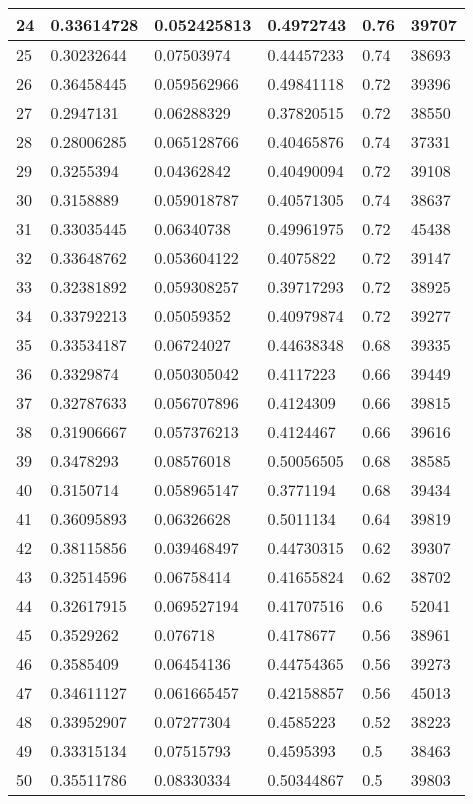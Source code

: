 \begin{longtable}{|l|l|l|l|l|l|}
24 & 0.33614728 & 0.052425813 & 0.4972743 & 0.76 & 39707 \\ \hline 
25 & 0.30232644 & 0.07503974 & 0.44457233 & 0.74 & 38693 \\ \hline 
26 & 0.36458445 & 0.059562966 & 0.49841118 & 0.72 & 39396 \\ \hline 
27 & 0.2947131 & 0.06288329 & 0.37820515 & 0.72 & 38550 \\ \hline 
28 & 0.28006285 & 0.065128766 & 0.40465876 & 0.74 & 37331 \\ \hline 
29 & 0.3255394 & 0.04362842 & 0.40490094 & 0.72 & 39108 \\ \hline 
30 & 0.3158889 & 0.059018787 & 0.40571305 & 0.74 & 38637 \\ \hline 
31 & 0.33035445 & 0.06340738 & 0.49961975 & 0.72 & 45438 \\ \hline 
32 & 0.33648762 & 0.053604122 & 0.4075822 & 0.72 & 39147 \\ \hline 
33 & 0.32381892 & 0.059308257 & 0.39717293 & 0.72 & 38925 \\ \hline 
34 & 0.33792213 & 0.05059352 & 0.40979874 & 0.72 & 39277 \\ \hline 
35 & 0.33534187 & 0.06724027 & 0.44638348 & 0.68 & 39335 \\ \hline 
36 & 0.3329874 & 0.050305042 & 0.4117223 & 0.66 & 39449 \\ \hline 
37 & 0.32787633 & 0.056707896 & 0.4124309 & 0.66 & 39815 \\ \hline 
38 & 0.31906667 & 0.057376213 & 0.4124467 & 0.66 & 39616 \\ \hline 
39 & 0.3478293 & 0.08576018 & 0.50056505 & 0.68 & 38585 \\ \hline 
40 & 0.3150714 & 0.058965147 & 0.3771194 & 0.68 & 39434 \\ \hline 
41 & 0.36095893 & 0.06326628 & 0.5011134 & 0.64 & 39819 \\ \hline 
42 & 0.38115856 & 0.039468497 & 0.44730315 & 0.62 & 39307 \\ \hline 
43 & 0.32514596 & 0.06758414 & 0.41655824 & 0.62 & 38702 \\ \hline 
44 & 0.32617915 & 0.069527194 & 0.41707516 & 0.6 & 52041 \\ \hline 
45 & 0.3529262 & 0.076718 & 0.4178677 & 0.56 & 38961 \\ \hline 
46 & 0.3585409 & 0.06454136 & 0.44754365 & 0.56 & 39273 \\ \hline 
47 & 0.34611127 & 0.061665457 & 0.42158857 & 0.56 & 45013 \\ \hline 
48 & 0.33952907 & 0.07277304 & 0.4585223 & 0.52 & 38223 \\ \hline 
49 & 0.33315134 & 0.07515793 & 0.4595393 & 0.5 & 38463 \\ \hline 
50 & 0.35511786 & 0.08330334 & 0.50344867 & 0.5 & 39803 \\ \hline 
\end{longtable}